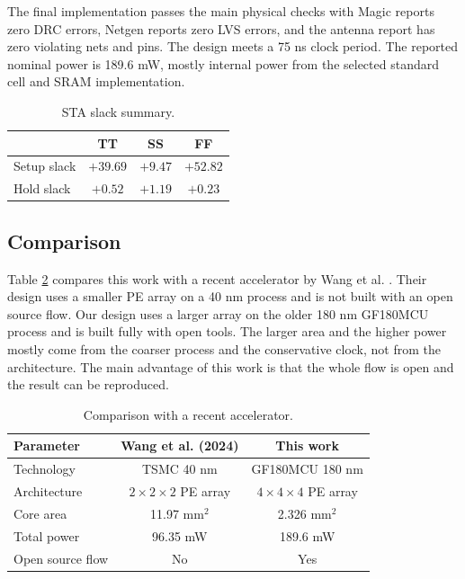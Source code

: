 \documentclass[conference]{IEEEtran}
\begin{document}
The final implementation passes the main physical checks with Magic reports zero DRC errors, Netgen reports zero LVS errors, and the antenna report has zero violating nets and pins. The design meets a 75 ns clock period. The reported nominal power is 189.6 mW, mostly internal power from the selected standard cell and SRAM implementation.

\begin{table}[h]
\caption{STA slack summary.}
\label{tab:corners}
\centering
\renewcommand{\arraystretch}{1.15}
\begin{tabular}{@{}lccc@{}}
\toprule
 & TT & SS & FF \\
\midrule
Setup slack & $+39.69$ & $+9.47$ & $+52.82$ \\
Hold slack  & $+0.52$  & $+1.19$ & $+0.23$  \\
\bottomrule
\end{tabular}
\end{table}

\subsection{Comparison}
Table \ref{tab:compare} compares this work with a recent accelerator by Wang et al. \cite{wang}. Their design uses a smaller PE array on a 40 nm process and is not built with an open source flow. Our design uses a larger array on the older 180 nm GF180MCU process and is built fully with open tools. The larger area and the higher power mostly come from the coarser process and the conservative clock, not from the architecture. The main advantage of this work is that the whole flow is open and the result can be reproduced.

\begin{table}[h]
\caption{Comparison with a recent accelerator.}
\label{tab:compare}
\centering
\renewcommand{\arraystretch}{1.15}
\begin{tabular}{@{}lcc@{}}
\toprule
Parameter & Wang et al. (2024) & This work \\
\midrule
Technology       & TSMC 40 nm                 & GF180MCU 180 nm \\
Architecture     & $2\times2\times2$ PE array & $4\times4\times4$ PE array \\
Core area        & 11.97 mm$^2$               & 2.326 mm$^2$ \\
Total power      & 96.35 mW                   & 189.6 mW \\
Open source flow & No                         & Yes \\
\bottomrule
\end{tabular}
\end{table}
\end{document}
